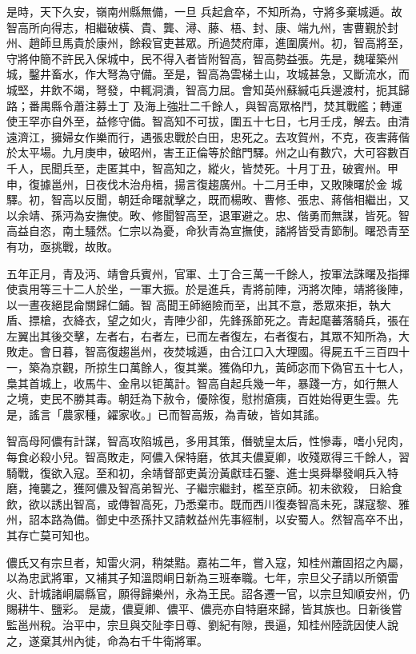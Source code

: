 \begin{pinyinscope}
 是時，天下久安，嶺南州縣無備，一旦
 兵起倉卒，不知所為，守將多棄城遁。故智高所向得志，相繼破橫、貴、龔、潯、藤、梧、封、康、端九州，害曹覲於封州、趙師旦馬貴於康州，餘殺官吏甚眾。所過焚府庫，進圍廣州。初，智高將至，守將仲簡不許民入保城中，民不得入者皆附智高，智高勢益張。先是，魏瓘築州城，鑿井畜水，作大弩為守備。至是，智高為雲梯土山，攻城甚急，又斷流水，而城堅，井飲不竭，弩發，中輒洞潰，智高力屈。會知英州蘇緘屯兵邊渡村，扼其歸路；番禺縣令蕭注募土丁
 及海上強壯二千餘人，與智高眾格鬥，焚其戰艦；轉運使王罕亦自外至，益修守備。智高知不可拔，圍五十七日，七月壬戌，解去。由清遠濟江，擁婦女作樂而行，遇張忠戰於白田，忠死之。去攻賀州，不克，夜害蔣偕於太平場。九月庚申，破昭州，害王正倫等於館門驛。州之山有數穴，大可容數百千人，民聞兵至，走匿其中，智高知之，縱火，皆焚死。十月丁丑，破賓州。甲申，復據邕州，日夜伐木治舟楫，揚言復趨廣州。十二月壬申，又敗陳曙於金
 城驛。初，智高以反聞，朝廷命曙就擊之，既而楊畋、曹修、張忠、蔣偕相繼出，又以余靖、孫沔為安撫使。畋、修聞智高至，退軍避之。忠、偕勇而無謀，皆死。智高益自恣，南土騷然。仁宗以為憂，命狄青為宣撫使，諸將皆受青節制。曙恐青至有功，亟挑戰，故敗。



 五年正月，青及沔、靖會兵賓州，官軍、土丁合三萬一千餘人，按軍法誅曙及指揮使袁用等三十二人於坐，一軍大振。於是進兵，青將前陣，沔將次陣，靖將後陣，以一晝夜絕昆侖關歸仁鋪。智
 高聞王師絕險而至，出其不意，悉眾來拒，執大盾、摽槍，衣絳衣，望之如火，青陣少卻，先鋒孫節死之。青起麾蕃落騎兵，張在左翼出其後交擊，左者右，右者左，已而左者復左，右者復右，其眾不知所為，大敗走。會日暮，智高復趨邕州，夜焚城遁，由合江口入大理國。得屍五千三百四十一，築為京觀，所掠生口萬餘人，復其業。獲偽印九，黃師宓而下偽官五十七人，梟其首城上，收馬牛、金帛以钜萬計。智高自起兵幾一年，暴踐一方，如行無人
 之境，吏民不勝其毒。朝廷為下赦令，優除復，慰拊瘡痍，百姓始得更生雲。先是，謠言「農家種，糴家收。」已而智高叛，為青破，皆如其謠。



 智高母阿儂有計謀，智高攻陷城邑，多用其策，僭號皇太后，性慘毒，嗜小兒肉，每食必殺小兒。智高敗走，阿儂入保特磨，依其夫儂夏卿，收殘眾得三千餘人，習騎戰，復欲入寇。至和初，余靖督部吏黃汾黃獻珪石鑒、進士吳舜舉發峒兵入特磨，掩襲之，獲阿儂及智高弟智光、子繼宗繼封，檻至京師。初未欲殺，
 日給食飲，欲以誘出智高，或傳智高死，乃悉棄市。既而西川復奏智高未死，謀寇黎、雅州，詔本路為備。御史中丞孫抃又請敕益州先事經制，以安蜀人。然智高卒不出，其存亡莫可知也。



 儂氏又有宗旦者，知雷火洞，稍桀黠。嘉祐二年，嘗入寇，知桂州蕭固招之內屬，以為忠武將軍，又補其子知溫悶峒日新為三班奉職。七年，宗旦父子請以所領雷火、計城諸峒屬縣官，願得歸樂州，永為王民。詔各遷一官，以宗旦知順安州，仍賜耕牛、鹽彩。
 是歲，儂夏卿、儂平、儂亮亦自特磨來歸，皆其族也。日新後嘗監邕州稅。治平中，宗旦與交阯李日尊、劉紀有隙，畏逼，知桂州陸詵因使人說之，遂棄其州內徙，命為右千牛衛將軍。




\end{pinyinscope}
